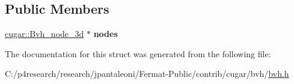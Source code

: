 \subsection*{Public Members}
\begin{DoxyCompactItemize}
\item 
\mbox{\label{structcugar_1_1_bvh__node__3d__bbox__iterator_a1fd3ce36de4ac2dc50b54e79afa12895}} 
\hyperlink{structcugar_1_1_bvh__node__3d}{cugar\+::\+Bvh\+\_\+node\+\_\+3d} $\ast$ {\bfseries nodes}
\end{DoxyCompactItemize}


The documentation for this struct was generated from the following file\+:\begin{DoxyCompactItemize}
\item 
C\+:/p4research/research/jpantaleoni/\+Fermat-\/\+Public/contrib/cugar/bvh/\hyperlink{bvh_8h}{bvh.\+h}\end{DoxyCompactItemize}

